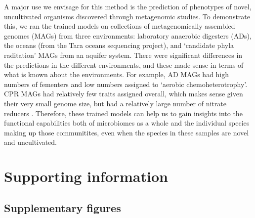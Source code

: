 \documentclass[10pt,letterpaper]{article}
\begin{document}
A major use we envisage for this method is the prediction of phenotypes of novel, uncultivated organisms discovered through metagenomic studies. To demonstrate this, we ran the trained models on collections of metagenomically assembled genomes (MAGs) from three environments: laboratory anaerobic digesters (ADs), the oceans (from the Tara oceans sequencing project), and `candidate phyla raditation' MAGs from an aquifer system. There were significant differences in the predictions in the different environments, and these made sense in terms of what is known about the environments. For example, AD MAGs had high numbers of fementers and low numbers assigned to `aerobic chemoheterotrophy'. CPR MAGs had relatively few traits assigned overall, which makes sense given their very small genome size, but had a relatively large number of nitrate reducers \cite{Danczak2017}. Therefore, these trained models can help us to gain insights into the functional capabilities both of microbiomes as a whole and the individual species making up those communitites, even when the species in these samples are novel and uncultivated.


\section*{Supporting information}

\subsection*{Supplementary figures}

\renewcommand{\thefigure}{S\arabic{figure}}

\setcounter{figure}{0}
\end{document}
